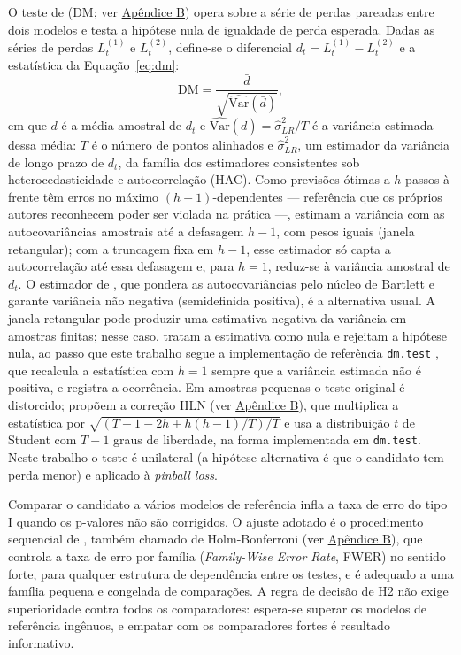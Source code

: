 O teste de  (DM; ver \hyperref[gl:dm]{Apêndice B}) opera sobre a série de perdas pareadas entre dois modelos e testa a hipótese nula de igualdade de perda esperada. Dadas as séries de perdas \(L_t^{(1)}\) e \(L_t^{(2)}\), define-se o diferencial \(d_t = L_t^{(1)} - L_t^{(2)}\) e a estatística da Equação~\ref{eq:dm}:
\begin{equation}
    \mathrm{DM} = \frac{\bar{d}}{\sqrt{\widehat{\mathrm{Var}}(\bar{d})}},
    \label{eq:dm}
\end{equation}
em que \(\bar{d}\) é a média amostral de \(d_t\) e \(\widehat{\mathrm{Var}}(\bar{d}) = \hat{\sigma}^2_{LR}/T\) é a variância estimada dessa média: \(T\) é o número de pontos alinhados e \(\hat{\sigma}^2_{LR}\), um estimador da variância de longo prazo de \(d_t\), da família dos estimadores consistentes sob heterocedasticidade e autocorrelação (HAC). Como previsões ótimas a \(h\) passos à frente têm erros no máximo \((h-1)\)-dependentes --- referência que os próprios autores reconhecem poder ser violada na prática ---,  estimam a variância com as autocovariâncias amostrais até a defasagem \(h-1\), com pesos iguais (janela retangular); com a truncagem fixa em \(h-1\), esse estimador só capta a autocorrelação até essa defasagem e, para \(h = 1\), reduz-se à variância amostral de \(d_t\). O estimador de , que pondera as autocovariâncias pelo núcleo de Bartlett e garante variância não negativa (semidefinida positiva), é a alternativa usual. A janela retangular pode produzir uma estimativa negativa da variância em amostras finitas; nesse caso,  tratam a estimativa como nula e rejeitam a hipótese nula, ao passo que este trabalho segue a implementação de referência \texttt{dm.test} \cite{RFORECAST}, que recalcula a estatística com \(h = 1\) sempre que a variância estimada não é positiva, e registra a ocorrência. Em amostras pequenas o teste original é distorcido;  propõem a correção HLN (ver \hyperref[gl:hln]{Apêndice B}), que multiplica a estatística por \(\sqrt{(T+1-2h+h(h-1)/T)/T}\) e usa a distribuição \(t\) de Student com \(T-1\) graus de liberdade, na forma implementada em \texttt{dm.test}. Neste trabalho o teste é unilateral (a hipótese alternativa é que o candidato tem perda menor) e aplicado à \textit{pinball loss}.

Comparar o candidato a vários modelos de referência infla a taxa de erro do tipo I quando os p-valores não são corrigidos. O ajuste adotado é o procedimento sequencial de , também chamado de Holm-Bonferroni (ver \hyperref[gl:holm]{Apêndice B}), que controla a taxa de erro por família (\textit{Family-Wise Error Rate}, FWER) no sentido forte, para qualquer estrutura de dependência entre os testes, e é adequado a uma família pequena e congelada de comparações. A regra de decisão de H2 não exige superioridade contra todos os comparadores: espera-se superar os modelos de referência ingênuos, e empatar com os comparadores fortes é resultado informativo.

